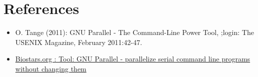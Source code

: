 \documentclass{article}
\begin{document}
\section{References}
\begin{itemize}
\item O. Tange (2011): GNU Parallel - The Command-Line Power Tool, ;login: The USENIX Magazine, February 2011:42-47.
\item \href{http://www.biostars.org/p/63816/}{Biostars.org : Tool: GNU Parallel - parallelize serial command line programs without changing them}
\end{itemize}
\end{document}
